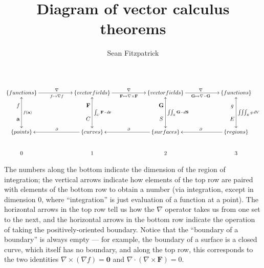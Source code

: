 \documentclass[12pt,letterpaper]{amsart}
\title{Diagram of vector calculus theorems}
\author{Sean Fitzpatrick}
\newcommand{\dotp}{\,\boldsymbol{\cdot}\,}
\begin{document}
\maketitle



\[\xymatrixcolsep{5pc}
\xymatrix{\{functions\} \ar[r]^{\nabla}_{f\mapsto \nabla f} \ar@{<->}[dd]_{\begin{matrix}
f\\ \\ \mathbf{a}
\end{matrix}}^{f(\mathbf{a})} & \{vector fields\} \ar[r]^{\nabla}_{\mathbf{F}\mapsto \nabla\times\mathbf{F}} \ar@{<->}[dd]_{\begin{matrix}
\mathbf{F} \\ \\ C
\end{matrix}}^{ \int_C\mathbf{F}\dotp d\mathbf{r}} & \{vector fields\} \ar[r]^{\nabla}_{\mathbf{G}\mapsto\nabla\dotp\mathbf{G}} \ar@{<->}[dd]_{\begin{matrix}
\mathbf{G}\\ \\ S
\end{matrix}}^{\iint_S\mathbf{G}\dotp d\mathbf{S}} & \{functions\} \ar@{<->}[dd]_{\begin{matrix}
g\\ \\ E
\end{matrix}}^{\iiint_E g\,dV}\\
 & & & \\
\{points\} & \{curves\} \ar[l]_{\partial} & \{surfaces\} \ar[l]_{\partial} & \{regions\} \ar[l]_{\partial}\\
 0 & 1 & 2 & 3}
 \]
 
 \medskip
 
The numbers along the bottom indicate the dimension of the region of integration; the vertical arrows indicate how elements of the top row are paired with elements of the bottom row to obtain a number (via integration, except in dimension 0, where ``integration'' is just evaluation of a function at a point). The horizontal arrows in the top row tell us how the $\nabla$ operator takes us from one set to the next, and the horizontal arrows in the bottom row indicate the operation of taking the positively-oriented boundary. Notice that the ``boundary of a boundary'' is always empty --- for example, the boundary of a surface is a closed curve, which itself has no boundary, and along the top row, this corresponds to the two identities $\nabla\times (\nabla f)= \mathbf{0}$ and $\nabla\dotp(\nabla\times \mathbf{F})=0$.
\end{document}
